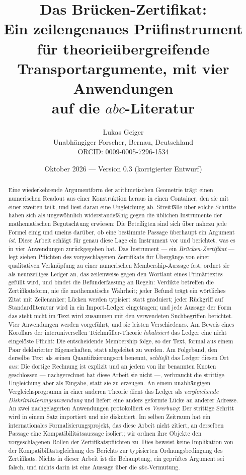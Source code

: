 \documentclass[11pt,a4paper]{article}
\title{Das Brücken-Zertifikat:\\
Ein zeilengenaues Prüfinstrument für theorieübergreifende\\
Transportargumente, mit vier Anwendungen\\
auf die $abc$-Literatur}
\author{Lukas Geiger\\[2pt]
\small Unabhängiger Forscher, Bernau, Deutschland\\
\small ORCID: 0009-0005-7296-1534}
\date{Oktober 2026 --- Version 0.3 (korrigierter Entwurf)}
\theoremstyle{definition}
\begin{document}
\maketitle

\begin{abstract}
\noindent
Eine wiederkehrende Argumentform der arithmetischen Geometrie trägt einen
numerischen Readout aus einer Konstruktion heraus in einen Container, den sie
mit einer zweiten teilt, und liest daran eine Ungleichung ab. Streitfälle über
solche Schritte haben sich als ungewöhnlich widerstandsfähig gegen die üblichen
Instrumente der mathematischen Begutachtung erwiesen: Die Beteiligten sind sich
über nahezu jede Formel einig und uneins darüber, ob eine bestimmte Passage
überhaupt ein Argument \emph{ist}. Diese Arbeit schlägt für genau diese Lage ein
Instrument vor und berichtet, was es in vier Anwendungen zurückgegeben hat. Das
Instrument --- ein \emph{Brücken-Zertifikat} --- legt sieben Pflichten des
vorgeschlagenen Zertifikats für Übergänge von einer qualitativen Verknüpfung
zu einer numerischen Membership-Aussage fest, ordnet sie als neunzeiliges Ledger an, das
zeilenweise gegen den Wortlaut eines Primärtextes gefüllt wird, und bindet die
Befunderfassung an Regeln: Verdikte betreffen die Zertifikatsform, nie die
mathematische Wahrheit; jeder Befund trägt ein wörtliches Zitat mit Zeilenanker;
Lücken werden typisiert statt graduiert; jeder Rückgriff auf Standardliteratur
wird in ein Import-Ledger eingetragen; und jede Aussage der Form \glqq das steht nicht
im Text\grqq{} wird zusammen mit den verwendeten Suchbegriffen berichtet. Vier
Anwendungen werden vorgeführt, und sie leisten Verschiedenes. Am Beweis eines
Korollars der interuniversellen Teichmüller-Theorie \emph{lokalisiert} das Ledger
eine nicht eingelöste Pflicht: Die entscheidende Membership folge, so der Text,
\glqq formal\grqq{} aus einem Paar deklarierter Eigenschaften, statt abgeleitet zu werden.
Am Folgeband, den derselbe Text als seinen Quantifizierungsort benennt,
\emph{schließt} das Ledger diesen Ort \emph{aus}: Die dortige Rechnung ist
explizit und an jedem von ihr benannten Knoten geschlossen --- nachgerechnet hat
diese Arbeit sie nicht ---, verbraucht die strittige Ungleichung aber als Eingabe,
statt sie zu erzeugen. An einem unabhängigen Vergleichsprogramm in einer anderen
Theorie
dient das Ledger als \emph{vergleichende Diskriminierungsanwendung} und liefert
eine anders geformte Lücke an anderer Adresse. An zwei nachgelagerten Anwendungen protokolliert es
\emph{Vererbung}: Der strittige Schritt wird in einem Satz importiert und nie
diskutiert. Im selben Zeitraum hat ein internationales Formalisierungsprojekt, das
diese Arbeit nicht zitiert, an derselben Passage eine
Kompatibilitätsaussage isoliert; wir ordnen ihre Objekte den vorgeschlagenen
Rollen der Zertifikatspflichten zu. Dies beweist keine Implikation von der
Kompatibilitätsgleichung des Berichts zur typisierten Ordnungsbedingung
des Zertifikats. Nichts in dieser Arbeit ist die Behauptung, ein geprüftes
Argument sei falsch, und nichts darin ist eine Aussage über die
$abc$-Vermutung.
\end{abstract}
\end{document}
